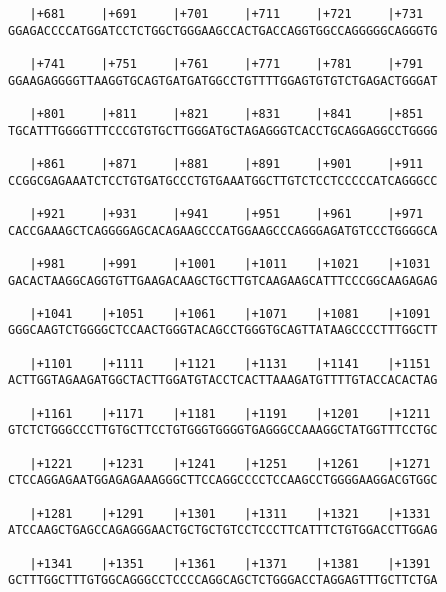 \documentclass{article}
\begin{document}
\begin{Verbatim}
   |+681     |+691     |+701     |+711     |+721     |+731  
GGAGACCCCATGGATCCTCTGGCTGGGAAGCCACTGACCAGGTGGCCAGGGGGCAGGGTG
                                                            
   |+741     |+751     |+761     |+771     |+781     |+791  
GGAAGAGGGGTTAAGGTGCAGTGATGATGGCCTGTTTTGGAGTGTGTCTGAGACTGGGAT
                                                            
   |+801     |+811     |+821     |+831     |+841     |+851  
TGCATTTGGGGTTTCCCGTGTGCTTGGGATGCTAGAGGGTCACCTGCAGGAGGCCTGGGG
                                                            
   |+861     |+871     |+881     |+891     |+901     |+911  
CCGGCGAGAAATCTCCTGTGATGCCCTGTGAAATGGCTTGTCTCCTCCCCCATCAGGGCC
                                                            
   |+921     |+931     |+941     |+951     |+961     |+971  
CACCGAAAGCTCAGGGGAGCACAGAAGCCCATGGAAGCCCAGGGAGATGTCCCTGGGGCA
                                                            
   |+981     |+991     |+1001    |+1011    |+1021    |+1031 
GACACTAAGGCAGGTGTTGAAGACAAGCTGCTTGTCAAGAAGCATTTCCCGGCAAGAGAG
                                                            
   |+1041    |+1051    |+1061    |+1071    |+1081    |+1091 
GGGCAAGTCTGGGGCTCCAACTGGGTACAGCCTGGGTGCAGTTATAAGCCCCTTTGGCTT
                                                            
   |+1101    |+1111    |+1121    |+1131    |+1141    |+1151 
ACTTGGTAGAAGATGGCTACTTGGATGTACCTCACTTAAAGATGTTTTGTACCACACTAG
                                                            
   |+1161    |+1171    |+1181    |+1191    |+1201    |+1211 
GTCTCTGGGCCCTTGTGCTTCCTGTGGGTGGGGTGAGGGCCAAAGGCTATGGTTTCCTGC
                                                            
   |+1221    |+1231    |+1241    |+1251    |+1261    |+1271 
CTCCAGGAGAATGGAGAGAAAGGGCTTCCAGGCCCCTCCAAGCCTGGGGAAGGACGTGGC
                                                            
   |+1281    |+1291    |+1301    |+1311    |+1321    |+1331 
ATCCAAGCTGAGCCAGAGGGAACTGCTGCTGTCCTCCCTTCATTTCTGTGGACCTTGGAG
                                                            
   |+1341    |+1351    |+1361    |+1371    |+1381    |+1391 
GCTTTGGCTTTGTGGCAGGGCCTCCCCAGGCAGCTCTGGGACCTAGGAGTTTGCTTCTGA
                                                            

\end{Verbatim}
\end{document}
